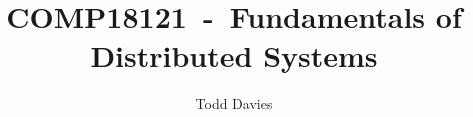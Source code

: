 \newcommand{\coursename}{Fundamentals of Distributed Systems}
\newcommand{\coursecode}{COMP18121}
\newcommand{\courseinfo}{}
\newcommand{\Author}{Todd Davies} 
\newcommand{\Title}{\coursecode~-~\coursename}
\author{\Author}
\title{\Title}
